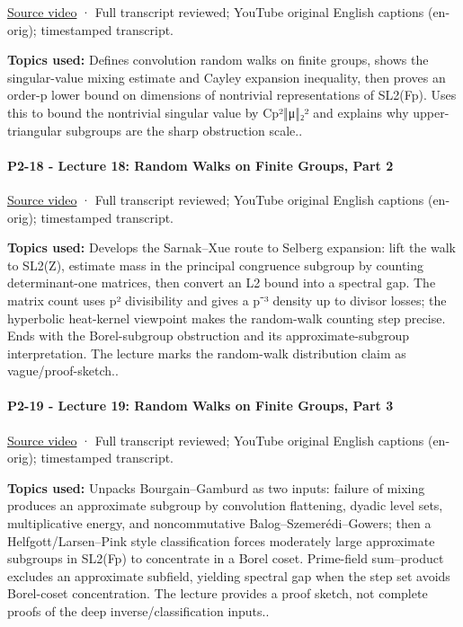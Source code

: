 \href{https://www.youtube.com/watch?v=QVDLMx0Guiw}{Source video} · Full transcript reviewed; YouTube original English captions (en-orig); timestamped transcript.

\textbf{Topics used:} Defines convolution random walks on finite groups, shows the singular-value mixing estimate and Cayley expansion inequality, then proves an order-p lower bound on dimensions of nontrivial representations of SL2(Fp). Uses this to bound the nontrivial singular value by Cp²‖μ‖₂² and explains why upper-triangular subgroups are the sharp obstruction scale..

\paragraph{P2-18 - Lecture 18: Random Walks on Finite Groups, Part 2}\label{p2-18---lecture-18-random-walks-on-finite-groups-part-2}

\href{https://www.youtube.com/watch?v=_jSFwF8rMdY}{Source video} · Full transcript reviewed; YouTube original English captions (en-orig); timestamped transcript.

\textbf{Topics used:} Develops the Sarnak--Xue route to Selberg expansion: lift the walk to SL2(Z), estimate mass in the principal congruence subgroup by counting determinant-one matrices, then convert an L2 bound into a spectral gap. The matrix count uses p² divisibility and gives a p⁻³ density up to divisor losses; the hyperbolic heat-kernel viewpoint makes the random-walk counting step precise. Ends with the Borel-subgroup obstruction and its approximate-subgroup interpretation. The lecture marks the random-walk distribution claim as vague/proof-sketch..

\paragraph{P2-19 - Lecture 19: Random Walks on Finite Groups, Part 3}\label{p2-19---lecture-19-random-walks-on-finite-groups-part-3}

\href{https://www.youtube.com/watch?v=bBzcaYNAfcI}{Source video} · Full transcript reviewed; YouTube original English captions (en-orig); timestamped transcript.

\textbf{Topics used:} Unpacks Bourgain--Gamburd as two inputs: failure of mixing produces an approximate subgroup by convolution flattening, dyadic level sets, multiplicative energy, and noncommutative Balog--Szemerédi--Gowers; then a Helfgott/Larsen--Pink style classification forces moderately large approximate subgroups in SL2(Fp) to concentrate in a Borel coset. Prime-field sum--product excludes an approximate subfield, yielding spectral gap when the step set avoids Borel-coset concentration. The lecture provides a proof sketch, not complete proofs of the deep inverse/classification inputs..

